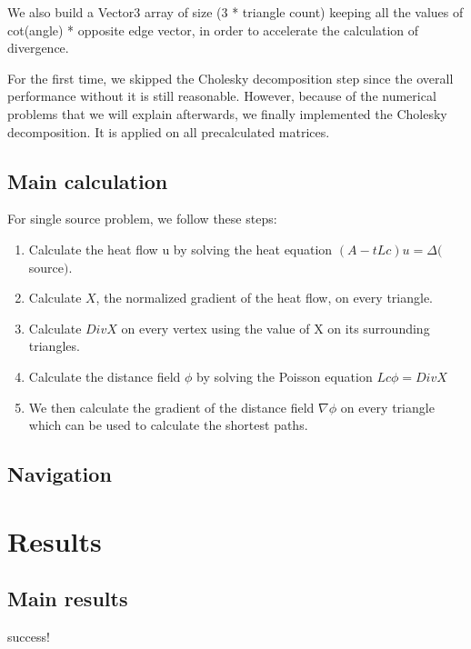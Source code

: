 \documentclass[a4paper,12pt,twoside]{article}
\begin{document}
We also build a Vector3 array of size (3 * triangle count) keeping all the values of cot(angle) * opposite edge vector, in order to accelerate the calculation of divergence.

For the first time, we skipped the Cholesky decomposition step since the overall performance without it is still reasonable. However, because of the numerical problems that we will explain afterwards, we finally implemented the Cholesky decomposition. It is applied on all precalculated matrices.

\subsection{Main calculation}

For single source problem, we follow these steps:

\begin{enumerate}
\item
Calculate the heat flow u by solving the heat equation $(A-tLc)u = \Delta($source$)$.
\item
Calculate $X$, the normalized gradient of the heat flow, on every triangle.
\item
Calculate $DivX$ on every vertex using the value of X on its surrounding triangles.
\item
Calculate the distance field $\phi$ by solving the Poisson equation $Lc \phi = DivX$
\item
We then calculate the gradient of the distance field $\nabla \phi$ on every triangle which can be used to calculate the shortest paths.
\end{enumerate}



\subsection{Navigation}



\section{Results}

\subsection{Main results}
success!
\end{document}
